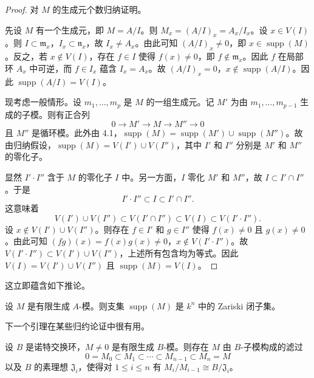 \begin{proof}
对 $M$ 的生成元个数归纳证明。

先设 $M$ 有一个生成元，即 $M=A/I$。则 $M_x=(A/I)_x=A_x/I_x$。设 $x\in V(I)$。则 $I\subset\mathfrak{m}_x$，$I_x\subset\mathfrak{n}_x$，故 $I_x\neq A_x$。由此可知 $(A/I)_x\neq 0$，即 $x\in\operatorname{supp}(M)$。反之，若 $x\notin V(I)$，存在 $f\in I$ 使得 $f(x)\neq 0$，即 $f\notin\mathfrak{m}_x$。因此 $f$ 在局部环 $A_x$ 中可逆，而 $f\in I_x$ 蕴含 $I_x=A_x$。故 $(A/I)_x=0$，$x\notin\operatorname{supp}(A/I)$。因此 $\operatorname{supp}(A/I)=V(I)$。

现考虑一般情形。设 $m_1,\dots,m_p$ 是 $M$ 的一组生成元。记 $M'$ 为由 $m_1,\dots,m_{p-1}$ 生成的子模。则有正合列
$$0\longrightarrow M'\longrightarrow M\longrightarrow M''\longrightarrow 0$$
且 $M''$ 是循环模。此外由 4.1，$\operatorname{supp}(M)=\operatorname{supp}(M')\cup\operatorname{supp}(M'')$。故由归纳假设，$\operatorname{supp}(M)=V(I')\cup V(I'')$，其中 $I'$ 和 $I''$ 分别是 $M'$ 和 $M''$ 的零化子。

显然 $I'\cdot I''$ 含于 $M$ 的零化子 $I$ 中。另一方面，$I$ 零化 $M'$ 和 $M''$，故 $I\subset I'\cap I''$。于是
$$I'\cdot I''\subset I\subset I'\cap I''.$$
这意味着
$$V(I')\cup V(I'')\subset V(I'\cap I'')\subset V(I)\subset V(I'\cdot I'').$$
设 $x\notin V(I')\cup V(I'')$。则存在 $f\in I'$ 和 $g\in I''$ 使得 $f(x)\neq 0$ 且 $g(x)\neq 0$。由此可知 $(fg)(x)=f(x)g(x)\neq 0$，$x\notin V(I'\cdot I'')$。故 $V(I'\cdot I'')\subset V(I')\cup V(I'')$，上述所有包含均为等式。因此 $V(I)=V(I')\cup V(I'')$ 且 $\operatorname{supp}(M)=V(I)$。
\end{proof}

这立即蕴含如下推论。

\begin{corollary}
设 $M$ 是有限生成 $A$-模。则支集 $\operatorname{supp}(M)$ 是 $k^n$ 中的 Zariski 闭子集。
\end{corollary}

下一个引理在某些归约论证中很有用。

\begin{lemma}
设 $B$ 是诺特交换环，$M\neq 0$ 是有限生成 $B$-模。则存在 $M$ 由 $B$-子模构成的滤过
$$0=M_0\subset M_1\subset\cdots\subset M_{n-1}\subset M_n=M$$
以及 $B$ 的素理想 $\mathfrak{J}_i$，使得对 $1\le i\le n$ 有 $M_i/M_{i-1}\cong B/\mathfrak{J}_i$。
\end{lemma}

